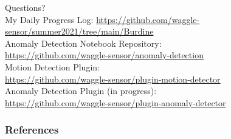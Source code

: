 \documentclass[10pt,handout]{beamer}
\begin{document}
{
\begin{frame}[standout]
  Questions?\\[8mm]
  \small{My Daily Progress Log:
  \href{https://github.com/waggle-sensor/summer2021/tree/main/Burdine}{https://github.com/waggle-sensor/summer2021/tree/main/Burdine}\\[6mm]
  Anomaly Detection Notebook Repository:\\[2mm]
  \href{https://github.com/waggle-sensor/anomaly-detection}{https://github.com/waggle-sensor/anomaly-detection}}\\[6mm]
  Motion Detection Plugin:\\[2mm]
  \href{https://github.com/waggle-sensor/plugin-motion-detector}{https://github.com/waggle-sensor/plugin-motion-detector}\\[6mm]
  Anomaly Detection Plugin (in progress):\\[2mm]
  \href{https://github.com/waggle-sensor/plugin-anomaly-detector}{https://github.com/waggle-sensor/plugin-anomaly-detector}\\[6mm]
\end{frame}}


\begin{frame}[allowframebreaks]
\frametitle{References}


\end{frame}

\appendix

%
\end{document}
